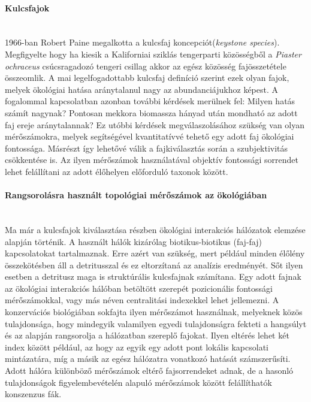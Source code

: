 \documentclass[a4paper,12pt]{article}
\begin{document}
	 \paragraph{Kulcsfajok} \mbox{}\\ %
	 1966-ban Robert Paine megalkotta a kulcsfaj koncepciót(\textit{keystone species}). Megfigyelte hogy ha kiesik a Kaliforniai sziklás tengerparti közösségből a \textit{Piaster ochraceus} csúcsragadozó tengeri csillag akkor az egész közösség fajösszetétele összeomlik. A mai legelfogadottabb kulcsfaj definíció szerint ezek olyan fajok, melyek ökológiai hatása aránytalanul nagy az abundanciájukhoz képest. A fogalommal kapcsolatban azonban további kérdések merülnek fel: Milyen hatás számít nagynak? Pontosan mekkora biomassza hányad után mondható az adott faj ereje aránytalannak? \cite{new_zeland} Ez utóbbi kérdések megválaszolásához szükség van olyan mérőszámokra, melyek segítségével kvantitatívvé tehető egy adott faj ökológiai fontossága. Másrészt így lehetővé válik a fajkiválasztás során a szubjektivitás csökkentése is. Az ilyen mérőszámok használatával objektív fontossági sorrendet lehet felállítani az adott élőhelyen előforduló taxonok között. \cite{jordan_comparison} 
	 
	 \paragraph{Rangsorolásra használt topológiai mérőszámok az ökológiában} \mbox{}\\
	 Ma már a kulcsfajok kiválasztása részben ökológiai interakciós hálózatok elemzése alapján történik. A használt hálók kizárólag biotikus-biotikus (faj-faj) kapcsolatokat tartalmaznak. Erre azért van szükség, mert például minden élőlény összekötésben áll a detritusszal és ez eltorzítaná az analízis eredményét. Sőt ilyen esetben a detritusz maga is struktúrális kulcsfajnak számítana. Egy adott fajnak az ökológiai interakciós hálóban betöltött szerepét pozicionális fontossági mérőszámokkal, vagy más néven centralitási indexekkel lehet jellemezni. A konzervációs biológiában sokfajta ilyen mérőszámot használnak, melyeknek közös tulajdonsága, hogy mindegyik valamilyen egyedi tulajdonságra fekteti a hangsúlyt és az alapján rangsorolja a hálózatban szereplő fajokat. Ilyen eltérés lehet két index között például, az hogy az egyik egy adott pont lokális kapcsolati mintázatára, míg a másik az egész hálózatra vonatkozó hatását számszerűsíti. Adott hálóra különböző mérőszámok eltérő fajsorrendeket adnak, de a hasonló tulajdonságok figyelembevételén alapuló mérőszámok között felállíthatók konszenzus fák. \cite{jordan_comparison}
	 
\end{document}
